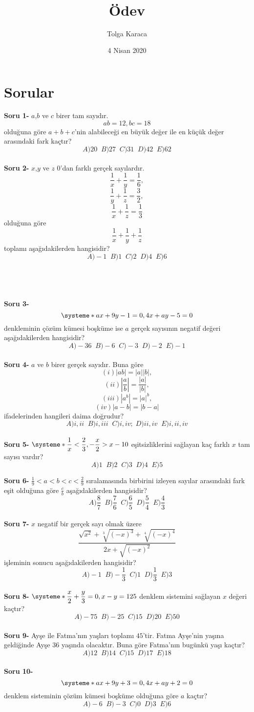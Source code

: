 \documentclass[a4paper,12pt,twocolumn]{article}
\begin{document}
\title{\Large{\textbf{Ödev}}}
\author{Tolga Karaca}
\date{4 Nisan 2020}
\maketitle

\section{Sorular}

\textbf{Soru 1-} $a$,$b$ ve $c$ birer tam sayıdır.$$ab=12,bc=18$$ olduğuna göre $a+b+c$'nin alabileceği en büyük değer ile en küçük değer arasındaki fark kaçtır?$$A)20\;\;B)27\;\;C)31\;\;D)42\;\;E)62$$
\\
\textbf{Soru 2-} $x$,$y$ ve $z$ $0$'dan farklı gerçek sayılardır.$$\frac{1}{x}+\frac{1}{y}=\frac{1}{6},$$$$\frac{1}{y}+\frac{1}{z}=\frac{3}{2},$$$$\frac{1}{x}+\frac{1}{z}=\frac{1}{3}$$ olduğuna göre $$\frac{1}{x}+\frac{1}{y}+\frac{1}{z}$$ toplamı aşağıdakilerden hangisidir?$$A)-1\;\;B)1\;\;C)2\;\;D)4\;\;E)6$$
\\ \\ \\ \\
\textbf{Soru 3-}$$\systeme*{ax+9y-1=0,4x+ay-5=0}$$denkleminin çözüm kümesi boşküme ise $a$ gerçek sayısının negatif değeri aşağıdakilerden hangisidir?$$A)-36\;\;B)-6\;\;C)-3\;\;D)-2\;\;E)-1$$
\\
\textbf{Soru 4-} $a$ ve $b$ birer gerçek sayıdır. Buna göre $$(i)|ab|=|a||b|,$$ $$(ii)\left|\frac{a}{b}\right|=\frac{|a|}{|b|},$$ $$(iii)|a^b|=|a|^b,$$ $$(iv)|a-b|=|b-a|$$ifadelerinden hangileri daima doğrudur?$$A)i,ii\;\;B)i,iii\;\;C)i,iv;\;D)ii,iv\;\;E)i,ii,iv$$
\\
\textbf{Soru 5-} $\displaystyle\systeme*{\frac{1}{x}<\frac{2}{3},-\frac{x}{2}>x-10}$ eşitsizliklerini sağlayan kaç farklı $x$ tam sayısı vardır?$$A)1\;\;B)2\;\;C)3\;\;D)4\;\;E)5$$

\textbf{Soru 6-} $\displaystyle\frac{1}{9}<a<b<c<\frac{2}{9}$ sıralamasında birbirini izleyen sayılar arasındaki fark eşit olduğuna göre $\frac{c}{b}$ aşağıdakilerden hangisidir?$$A)\frac{8}{7}\;\;B)\frac{7}{6}\;\;C)\frac{6}{5}\;\;D)\frac{5}{4}\;\;E)\frac{4}{3}$$
\\
\textbf{Soru 7-} $x$ negatif bir gerçek sayı olmak üzere $$\frac{\sqrt{x^2}+\sqrt[3]{(-x)^3}+\sqrt[4]{(-x)^4}}{2x+\sqrt{(-x)^2}}$$işleminin sonucu aşağıdakilerden hangisidir?$$A)-1\;\;B)-\frac{1}{3}\;\;C)1\;\;D)\frac{1}{3}\;\;E)3$$
\\
\textbf{Soru 8-} $\displaystyle\systeme*{\frac{x}{2}+\frac{y}{3}=0,x-y=125}$ denklem sistemini sağlayan $x$ değeri kaçtır?$$A)-75\;\;B)-25\;\;C)15\;\;D)20\;\;E)50$$
\\
\textbf{Soru 9-} Ayşe ile Fatma'nın yaşları toplamı $45$'tir. Fatma Ayşe'nin yaşına geldiğinde Ayşe $36$ yaşında olacaktır. Buna göre Fatma'nın bugünkü yaşı kaçtır?$$A)12\;\;B)14\;\;C)15\;\;D)17\;\;E)18$$
\\
\textbf{Soru 10-}$$\systeme*{ax+9y+3=0,4x+ay+2=0}$$denklem sisteminin çözüm kümesi boşküme olduğuna göre $a$ kaçtır?$$A)-6\;\;B)-3\;\;C)0\;\;D)3\;\;E)6$$
\end{document}
